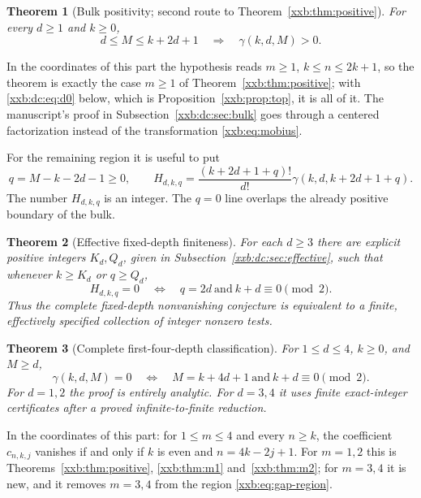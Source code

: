 \documentclass[11pt,a4paper]{article}
\numberwithin{equation}{section}
\newtheorem{theorem}{Theorem}[section]
\theoremstyle{definition}
\theoremstyle{remark}
\theoremstyle{plain}
\begin{document}
\begin{theorem}[Bulk positivity; second route to Theorem~\ref{xxb:thm:positive}]\label{xxb:dc:thm:bulk}
For every $d\ge1$ and $k\ge0$,
\[
 d\le M\le k+2d+1\quad\Longrightarrow\quad\gamma(k,d,M)>0.
\]
\end{theorem}

In the coordinates of this part the hypothesis reads $m\ge1$, $k\le n\le2k+1$,
so the theorem is exactly the case $m\ge1$ of
Theorem~\ref{xxb:thm:positive}; with \eqref{xxb:dc:eq:d0} below, which is
Proposition~\ref{xxb:prop:top}, it is all of it.  The manuscript's proof in
Subsection~\ref{xxb:dc:sec:bulk} goes through a centered factorization instead
of the transformation \eqref{xxb:eq:mobius}.

For the remaining region it is useful to put
\begin{equation}\label{xxb:dc:eq:q}
 q=M-k-2d-1\ge0,
 \qquad H_{d,k,q}=\frac{(k+2d+1+q)!}{d!}\gamma(k,d,k+2d+1+q).
\end{equation}
The number $H_{d,k,q}$ is an integer.  The $q=0$ line overlaps the already
positive boundary of the bulk.

\begin{theorem}[Effective fixed-depth finiteness]\label{xxb:dc:thm:finite}
For each $d\ge3$ there are explicit positive integers $K_d,Q_d$, given in
Subsection~\ref{xxb:dc:sec:effective}, such that whenever $k\ge K_d$ or
$q\ge Q_d$,
\[
 H_{d,k,q}=0\quad\Longleftrightarrow\quad q=2d\ \text{and}\ k+d\equiv0\pmod2.
\]
Thus the complete fixed-depth nonvanishing conjecture is equivalent to a
finite, effectively specified collection of integer nonzero tests.
\end{theorem}

\begin{theorem}[Complete first-four-depth classification]\label{xxb:dc:thm:four}
For $1\le d\le4$, $k\ge0$, and $M\ge d$,
\begin{equation}\label{xxb:dc:eq:classification}
 \gamma(k,d,M)=0
 \quad\Longleftrightarrow\quad
 M=k+4d+1\ \text{and}\ k+d\equiv0\pmod2.
\end{equation}
For $d=1,2$ the proof is entirely analytic.  For $d=3,4$ it uses finite
exact-integer certificates after a proved infinite-to-finite reduction.
\end{theorem}

In the coordinates of this part: for $1\le m\le4$ and every $n\ge k$, the
coefficient $c_{n,k,j}$ vanishes if and only if $k$ is even and $n=4k-2j+1$.
For $m=1,2$ this is Theorems~\ref{xxb:thm:positive}, \ref{xxb:thm:m1}
and~\ref{xxb:thm:m2}; for $m=3,4$ it is new, and it removes $m=3,4$ from the
region \eqref{xxb:eq:gap-region}.
\end{document}
